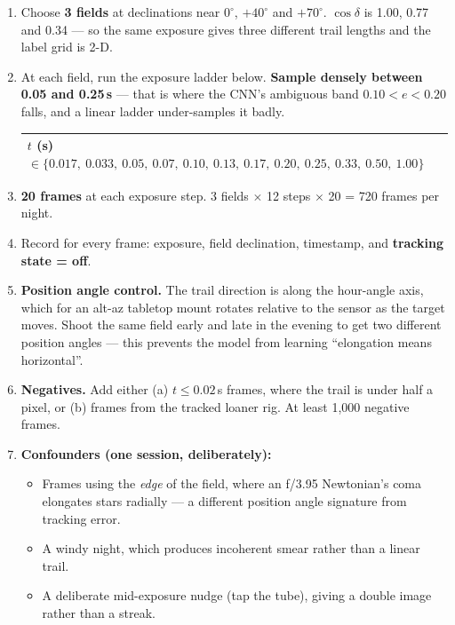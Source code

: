 \documentclass[11pt]{article}
\begin{document}
\begin{enumerate}
\item Choose \textbf{3 fields} at declinations near $0^\circ$, $+40^\circ$ and
      $+70^\circ$. $\cos\delta$ is 1.00, 0.77 and 0.34 --- so the same exposure
      gives three different trail lengths and the label grid is 2-D.
\item At each field, run the exposure ladder below. \textbf{Sample densely
      between 0.05 and 0.25\,s} --- that is where the CNN's ambiguous band
      $0.10 < e < 0.20$ falls, and a linear ladder under-samples it badly.
\begin{center}
\small
\begin{tabular}{@{}l@{}}
\toprule
$t$ (s) $\in \{0.017,\ 0.033,\ 0.05,\ 0.07,\ 0.10,\ 0.13,\ 0.17,\ 0.20,\ 0.25,\ 0.33,\ 0.50,\ 1.00\}$ \\
\bottomrule
\end{tabular}
\end{center}
\item \textbf{20 frames} at each exposure step. 3 fields $\times$ 12 steps
      $\times$ 20 = 720 frames per night.
\item Record for every frame: exposure, field declination, timestamp, and
      \textbf{tracking state = off}.
\item \textbf{Position angle control.} The trail direction is along the
      hour-angle axis, which for an alt-az tabletop mount rotates relative to
      the sensor as the target moves. Shoot the same field early and late in the
      evening to get two different position angles --- this prevents the model
      from learning ``elongation means horizontal''.
\item \textbf{Negatives.} Add either (a) $t \leq 0.02$\,s frames, where the trail
      is under half a pixel, or (b) frames from the tracked loaner rig. At least
      1,000 negative frames.
\item \textbf{Confounders (one session, deliberately):}
      \begin{itemize}
      \item Frames using the \emph{edge} of the field, where an f/3.95
            Newtonian's coma elongates stars radially --- a different position
            angle signature from tracking error.
      \item A windy night, which produces incoherent smear rather than a linear
            trail.
      \item A deliberate mid-exposure nudge (tap the tube), giving a double
            image rather than a streak.
      \end{itemize}
\end{enumerate}
\end{document}
